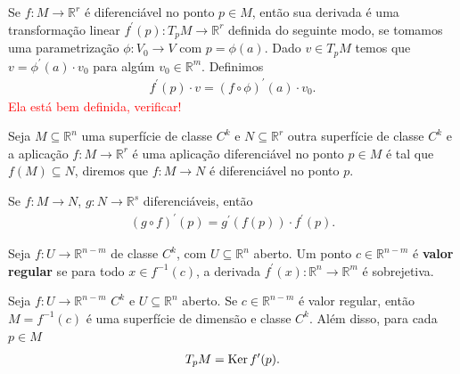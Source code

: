 \begin{note}
  Se $f:M\to\mathbb{R}^{r}$ é diferenciável no ponto $p\in M$, então sua derivada é uma transformação linear $f^{\prime}(p):T_pM\to\mathbb{R}^{r}$ definida do seguinte modo, se tomamos uma parametrização $\phi:V_0\to V$ com $p=\phi(a)$. Dado $v\in T_pM$ temos que $v=\phi^{\prime}(a)\cdot v_0$ para algúm $v_0\in \mathbb{R}^{m}$. Definimos
  \begin{align*}
    f^{\prime}(p)\cdot v= (f\circ \phi)^{\prime}(a)\cdot v_0.
  \end{align*}
  \textcolor{red}{Ela está bem definida, verificar!}
\end{note}
\begin{definition}
  Seja $M\subseteq \mathbb{R}^{n}$ uma superfície de classe $C^{k}$ e $N\subseteq \mathbb{R}^{r}$ outra superfície de classe $C^{k}$ e a aplicação $f:M\to \mathbb{R}^{r}$ é uma aplicação diferenciável no ponto $p\in M$ é tal que $f(M)\subseteq N$, diremos que $f:M\to N$ é diferenciável no ponto $p$.
  \begin{center}
      
  \end{center}
\end{definition}
\begin{proposition}
  Se $f:M\to N$, $g:N\to\mathbb{R}^{s}$ diferenciáveis, então
  \begin{align*}
    (g\circ f)^{\prime}(p)=g^{\prime}(f(p))\cdot f^{\prime}(p).
  \end{align*}
\end{proposition}
\begin{definition}
  Seja $f:U\to\mathbb{R}^{n-m}$ de classe $C^{k}$, com $U\subseteq \mathbb{R}^{n}$ aberto. Um ponto $c\in\mathbb{R}^{n-m}$ é \textbf{valor regular} se para todo $x\in f^{-1}(c)$, a derivada $f^{\prime}(x):\mathbb{R}^{n}\to\mathbb{R}^{m}$ é sobrejetiva. 
\end{definition}
\begin{theorem}
  Seja $f:U\to\mathbb{R}^{n-m}$ $C^{k}$ e $U\subseteq\mathbb{R}^{n}$ aberto. Se $c\in \mathbb{R}^{n-m}$ é valor regular, então $M=f^{-1}(c)$ é uma superfície de dimensão e classe $C^{k}$. Além disso, para cada $p\in M$
  \begin{align*}
    T_pM=\operatorname{Ker} f^{\prime}(p).
  \end{align*}
\end{theorem}
